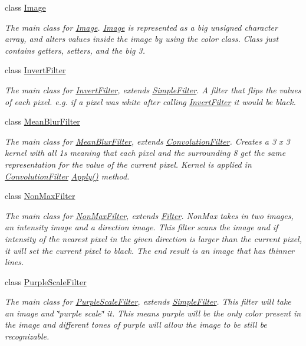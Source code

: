 \begin{DoxyCompactItemize}
class \hyperlink{classImage}{Image}
\begin{DoxyCompactList}\small\item\em The main class for \hyperlink{classImage}{Image}. \hyperlink{classImage}{Image} is represented as a big unsigned character array, and alters values inside the image by using the color class. Class just contains getters, setters, and the big 3. \end{DoxyCompactList}\item 
class \hyperlink{classInvertFilter}{Invert\+Filter}
\begin{DoxyCompactList}\small\item\em The main class for \hyperlink{classInvertFilter}{Invert\+Filter}, extends \hyperlink{classSimpleFilter}{Simple\+Filter}. A filter that flips the values of each pixel. e.\+g. if a pixel was white after calling \hyperlink{classInvertFilter}{Invert\+Filter} it would be black. \end{DoxyCompactList}\item 
class \hyperlink{classMeanBlurFilter}{Mean\+Blur\+Filter}
\begin{DoxyCompactList}\small\item\em The main class for \hyperlink{classMeanBlurFilter}{Mean\+Blur\+Filter}, extends \hyperlink{classConvolutionFilter}{Convolution\+Filter}. Creates a 3 x 3 kernel with all 1\textquotesingle{}s meaning that each pixel and the surrounding 8 get the same representation for the value of the current pixel. Kernel is applied in \hyperlink{classConvolutionFilter}{Convolution\+Filter} \hyperlink{classMeanBlurFilter_abb7824005c70b04aca6a24760f85cbc1}{Apply()} method. \end{DoxyCompactList}\item 
class \hyperlink{classNonMaxFilter}{Non\+Max\+Filter}
\begin{DoxyCompactList}\small\item\em The main class for \hyperlink{classNonMaxFilter}{Non\+Max\+Filter}, extends \hyperlink{classFilter}{Filter}. Non\+Max takes in two images, an intensity image and a direction image. This filter scans the image and if intensity of the nearest pixel in the given direction is larger than the current pixel, it will set the current pixel to black. The end result is an image that has thinner lines. \end{DoxyCompactList}\item 
class \hyperlink{classPurpleScaleFilter}{Purple\+Scale\+Filter}
\begin{DoxyCompactList}\small\item\em The main class for \hyperlink{classPurpleScaleFilter}{Purple\+Scale\+Filter}, extends \hyperlink{classSimpleFilter}{Simple\+Filter}. This filter will take an image and \char`\"{}purple scale\char`\"{} it. This means purple will be the only color present in the image and different tones of purple will allow the image to be still be recognizable. \end{DoxyCompactList}\item 

\end{DoxyCompactItemize}
